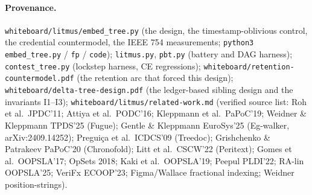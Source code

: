 \documentclass[11pt]{article}
\newcommand{\code}[1]{\texttt{#1}}
\begin{document}
\paragraph{Provenance.} \code{whiteboard/litmus/embed\_tree.py} (the
design, the timestamp-oblivious control, the credential countermodel,
the IEEE 754 measurements; \code{python3 embed\_tree.py} /
\code{fp} / \code{code}); \code{litmus.py}, \code{pbt.py} (battery and
DAG harness); \code{contest\_tree.py} (lockstep harness, CE
regressions); \code{whiteboard/retention-countermodel.pdf} (the
retention arc that forced this design);
\code{whiteboard/delta-tree-design.pdf} (the ledger-based sibling
design and the invariants I1--I3);
\code{whiteboard/litmus/related-work.md} (verified source list:
Roh et al.\ JPDC'11; Attiya et al.\ PODC'16; Kleppmann et al.\
PaPoC'19; Weidner \& Kleppmann TPDS'25 (Fugue); Gentle \& Kleppmann
EuroSys'25 (Eg-walker, arXiv:2409.14252); Preguiça et al.\ ICDCS'09
(Treedoc); Grishchenko \& Patrakeev PaPoC'20 (Chronofold); Litt et
al.\ CSCW'22 (Peritext); Gomes et al.\ OOPSLA'17; OpSets 2018; Kaki et
al.\ OOPSLA'19; Peepul PLDI'22; RA-lin OOPSLA'25; VeriFx ECOOP'23;
Figma/Wallace fractional indexing; Weidner position-strings).
\end{document}
